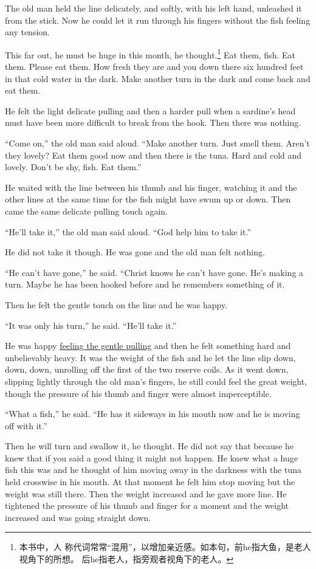 \documentclass[fontset=ubuntu,zihao=-4]{ctexrep}
\begin{document}
The old man held the line delicately, and softly, with his left hand,
\gls{unleashed} it from the stick. Now he could let it run through his
fingers without the fish feeling any \gls{tension}.

This far out, he must be huge in this month, he thought.\footnote{本书中，人
  称代词常常“混用”，以增加亲近感。如本句，前he指大鱼，是老人视角下的所想。
  后he指老人，指旁观者视角下的老人。} Eat them, fish. Eat them. Please eat
them. How fresh they are and you down there six hundred feet in that cold
water in the dark. Make another turn in the dark and come back and eat them.

He felt the light delicate pulling and then a harder pull when a sardine's
head must have been more difficult to break from the hook. Then there was
nothing.

``Come on,'' the old man said aloud. ``Make another turn. Just smell them.
Aren't they lovely? Eat them good now and then there is the tuna. Hard and
cold and lovely. Don't be shy, fish. Eat them.''

He waited with the line between his thumb and his finger, watching it and
the other lines at the same time for the fish might have swum up or down.
Then came the same delicate pulling touch again.

``He'll take it,'' the old man said aloud. ``God help him to take it.''

He did not take it though. He was gone and the old man felt nothing.

``He can't have gone,'' he said. ``\gls{Christ} knows he can't have gone. He's
making a turn. Maybe he has been hooked before and he remembers something of
it.

Then he felt the \gls{gentle} touch on the line and he was happy.

``It was only his turn,'' he said. ``He'll take it.''

He was happy \uline{feeling the gentle pulling} and then he felt something hard
and unbelievably heavy. It was the weight of the fish and he let the line
\gls{slip} down, down, down, \gls{unrolling} off the first of the two
\gls{reserve} coils. As it went down, slipping lightly through the old man's
fingers, he still could feel the great weight, though the \gls{pressure} of
his thumb and finger were almost \gls{imperceptible}.

``What a fish,'' he said. ``He has it \gls{sideways} in his mouth now and he is moving off with it.''

Then he will turn and \gls{swallow} it, he thought. He did not say that
because he knew that if you said a good thing it might not happen. He knew
what a huge fish this was and he thought of him moving away in the darkness
with the tuna held \gls{crosswise} in his mouth. At that moment he felt him
stop moving but the weight was still there. Then the weight increased and he
gave more line. He \gls{tightened} the pressure of his thumb and finger for a
moment and the weight increased and was going straight down.
\end{document}
